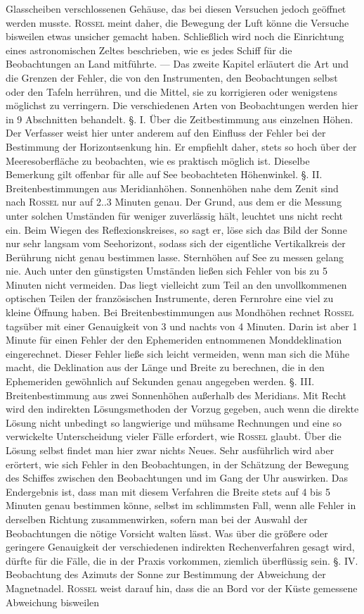 Glasscheiben verschlossenen Gehäuse, das bei diesen Versuchen jedoch geöffnet werden musste. \textsc{Rossel} meint daher, die Bewegung der Luft könne die Versuche bisweilen etwas unsicher gemacht haben. Schließlich wird noch die Einrichtung eines astronomischen Zeltes beschrieben, wie es jedes Schiff für die Beobachtungen an Land mitführte. — Das zweite Kapitel erläutert die Art und die Grenzen der Fehler, die von den Instrumenten, den Beobachtungen selbst oder den Tafeln herrühren, und die Mittel, sie zu korrigieren oder wenigstens möglichst zu verringern. Die verschiedenen Arten von Beobachtungen werden hier in 9 Abschnitten behandelt. §. I. Über die Zeitbestimmung aus einzelnen Höhen. Der Verfasser weist hier unter anderem auf den Einfluss der Fehler bei der Bestimmung der Horizontsenkung hin. Er empfiehlt daher, stets so hoch über der Meeresoberfläche zu beobachten, wie es praktisch möglich ist. Dieselbe Bemerkung gilt offenbar für alle auf See beobachteten Höhenwinkel. §. II. Breitenbestimmungen aus Meridianhöhen. Sonnenhöhen nahe dem Zenit sind nach \textsc{Rossel} nur auf 2..3 Minuten genau. Der Grund, aus dem er die Messung unter solchen Umständen für weniger zuverlässig hält, leuchtet uns nicht recht ein. Beim Wiegen des Reflexionskreises, so sagt er, löse sich das Bild der Sonne nur sehr langsam vom Seehorizont, sodass sich der eigentliche Vertikalkreis der Berührung nicht genau bestimmen lasse. Sternhöhen auf See zu messen gelang nie. Auch unter den günstigsten Umständen ließen sich Fehler von bis zu 5 Minuten nicht vermeiden. Das liegt vielleicht zum Teil an den unvollkommenen optischen Teilen der französischen Instrumente, deren Fernrohre eine viel zu kleine Öffnung haben. Bei Breitenbestimmungen aus Mondhöhen rechnet \textsc{Rossel} tagsüber mit einer Genauigkeit von 3 und nachts von 4 Minuten. Darin ist aber 1 Minute für einen Fehler der den Ephemeriden entnommenen Monddeklination eingerechnet. Dieser Fehler ließe sich leicht vermeiden, wenn man sich die Mühe macht, die Deklination aus der Länge und Breite zu berechnen, die in den Ephemeriden gewöhnlich auf Sekunden genau angegeben werden. §. III. Breitenbestimmung aus zwei Sonnenhöhen außerhalb des Meridians. Mit Recht wird den indirekten Lösungsmethoden der Vorzug gegeben, auch wenn die direkte Lösung nicht unbedingt so langwierige und mühsame Rechnungen und eine so verwickelte Unterscheidung vieler Fälle erfordert, wie \textsc{Rossel} glaubt. Über die Lösung selbst findet man hier zwar nichts Neues. Sehr ausführlich wird aber erörtert, wie sich Fehler in den Beobachtungen, in der Schätzung der Bewegung des Schiffes zwischen den Beobachtungen und im Gang der Uhr auswirken. Das Endergebnis ist, dass man mit diesem Verfahren die Breite stets auf 4 bis 5 Minuten genau bestimmen könne, selbst im schlimmsten Fall, wenn alle Fehler in derselben Richtung zusammenwirken, sofern man bei der Auswahl der Beobachtungen die nötige Vorsicht walten lässt. Was über die größere oder geringere Genauigkeit der verschiedenen indirekten Rechenverfahren gesagt wird, dürfte für die Fälle, die in der Praxis vorkommen, ziemlich überflüssig sein. §. IV. Beobachtung des Azimuts der Sonne zur Bestimmung der Abweichung der Magnetnadel. \textsc{Rossel} weist darauf hin, dass die an Bord vor der Küste gemessene Abweichung bisweilen 